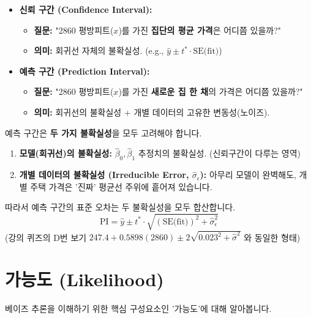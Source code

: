 \documentclass[11pt,a4paper]{book}
\theoremstyle{definition}
\begin{document}
\begin{itemize}
    \item \textbf{신뢰 구간 (Confidence Interval):}
        \begin{itemize}
            \item \textbf{질문:} "2860 평방피트($x$)를 가진 \textbf{집단의 평균 가격}은 어디쯤 있을까?"
            \item \textbf{의미:} 회귀선 자체의 불확실성. (e.g., $\hat{y} \pm t^* \cdot \text{SE(fit)}$)
        \end{itemize}
    \item \textbf{예측 구간 (Prediction Interval):}
        \begin{itemize}
            \item \textbf{질문:} "2860 평방피트($x$)를 가진 \textbf{새로운 집 한 채}의 가격은 어디쯤 있을까?"
            \item \textbf{의미:} 회귀선의 불확실성 + 개별 데이터의 고유한 변동성(노이즈).
        \end{itemize}
\end{itemize}

\begin{warningbox}[title=예측 구간(PI)은 항상 더 넓습니다]
    예측 구간은 \textbf{두 가지 불확실성}을 모두 고려해야 합니다.

    \begin{enumerate}
        \item \textbf{모델(회귀선)의 불확실성:} $\hat{\beta}_0, \hat{\beta}_1$ 추정치의 불확실성. (신뢰구간이 다루는 영역)
        \item \textbf{개별 데이터의 불확실성 (Irreducible Error, $\hat{\sigma}_\epsilon$):} 아무리 모델이 완벽해도, 개별 주택 가격은 '진짜' 평균선 주위에 흩어져 있습니다.
    \end{enumerate}

    따라서 예측 구간의 표준 오차는 두 불확실성을 모두 합산합니다.
    $$ \text{PI} = \hat{y} \pm t^* \cdot \sqrt{(\text{SE(fit)})^2 + \hat{\sigma}_\epsilon^2} $$
    (강의 퀴즈의 D번 보기 $247.4+0.5898(2860) \pm 2\sqrt{0.023^{2}+\hat{\sigma}^{2}}$ 와 동일한 형태)
\end{warningbox}


\section{가능도 (Likelihood)}

베이즈 추론을 이해하기 위한 핵심 구성요소인 '가능도'에 대해 알아봅니다.
\end{document}
